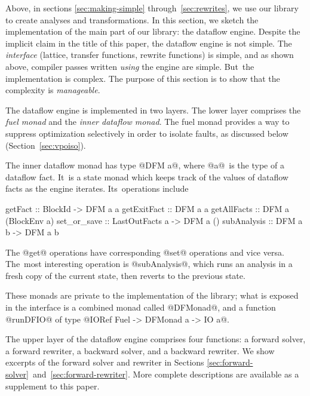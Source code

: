 \documentclass[blockstyle,preprint,natbib,nocopyrightspace]{sigplanconf}
\let\cite\citep
\newcommand{\authornote}[1]{{\em #1}}
\def\authornote#1{\unskip\relax}
\newcommand{\norman}[1]{\authornote{NR: #1}}
\let\remark\norman
\newcommand{\john}[1]{\authornote{JD: #1}}
\newcommand\secref[1]{Section~\ref{sec:#1}}
\newcommand\secreftwo[2]{Sections \ref{sec:#1}~and~\ref{sec:#2}}
\begin{document}
Above, in sections \ref{sec:making-simple}
through~\ref{sec:rewrites},
we use our library to create analyses and transformations.
In this section, we sketch the implementation of the main part of our
library: the dataflow engine.
Despite the implicit claim in the title of this paper,
the dataflow engine is not simple.
The \emph{interface} (lattice, transfer functions, rewrite functions) is simple,
and as shown above, compiler passes written \emph{using} the engine
are simple.
But~the implementation is complex.
The purpose of this section is to show that the complexity is \emph{manageable}.


The dataflow engine is implemented in two layers.
The lower layer comprises the \emph{fuel monad} and the \emph{inner dataflow monad}.
The fuel monad provides a way to suppress
optimization selectively in order to isolate faults, as discussed
below (\secref{vpoiso}). 

The inner dataflow monad has type @DFM a@, where @a@~is the type of a
dataflow fact.
It~is a state monad which keeps track of the values of dataflow facts
as the engine iterates.
Its~operations include %
\begin{code}
getFact     :: BlockId -> DFM a a
getExitFact :: DFM a a
getAllFacts :: DFM a (BlockEnv a)
set_or_save :: LastOutFacts a -> DFM a ()
subAnalysis :: DFM a b -> DFM a b
\end{code}
The @get@ operations have corresponding @set@ operations and vice
versa.
The~most interesting operation is @subAnalysis@, which
runs an analysis in a fresh copy of the current state, then reverts to
the previous state.

These monads are private to the implementation of the library;
what is exposed in the interface is a combined monad called @DFMonad@, and a function
@runDFIO@ of type @IORef Fuel -> DFMonad a -> IO a@.
\remark{Unfortunately, this is the first mention of @Fuel@}

The upper layer of the dataflow engine comprises four functions:
a forward solver, a forward rewriter,
a backward solver, and a backward rewriter.
We show excerpts of the forward solver and rewriter in
\secreftwo{forward-solver}{forward-rewriter}. 
More complete descriptions are available as a supplement to this
paper. 
\end{document}
